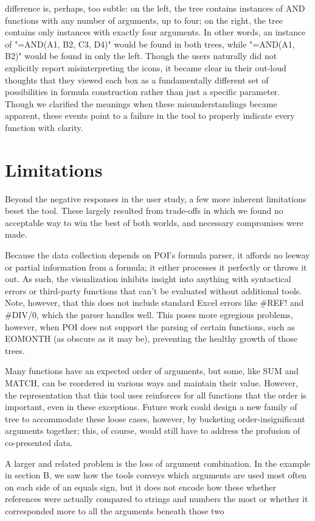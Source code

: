 \documentclass[conference]{IEEEtran}
\begin{document}
	difference is, perhaps, too subtle: on the left, the tree contains instances of
	AND functions with any number of arguments, up to four; on the right, the tree
	contains only instances with exactly four arguments. In other words, an
	instance of "=AND(A1, B2, C3, D4)" would be found in both trees, while
	"=AND(A1, B2)" would be found in only the left. Though the users naturally did
	not explicitly report misinterpreting the icons, it became clear in their
	out-loud thoughts that they viewed each box as a fundamentally different set of
	possibilities in formula construction rather than just a specific parameter.
	Though we clarified the meanings when these misunderstandings became apparent,
	these events point to a failure in the tool to properly indicate every function
	with clarity.   \par
	
	
	
	\section{Limitations} Beyond the negative responses in the user study, a few
	more inherent limitations beset the tool. These largely resulted from
	trade-offs in which we found no acceptable way to win the best of both worlds,
	and necessary compromises were made. \par Because the data collection depends
	on POI's formula parser, it affords no leeway or partial information from a
	formula; it either processes it perfectly or throws it out. As such, the
	visualization inhibits insight into anything with syntactical errors or
	third-party functions that can't be evaluated without additional tools. Note,
	however, that this does not include standard Excel errors like \#REF! and
	\#DIV/0, which the parser handles well. This poses more egregious problems,
	however, when POI does not support the parsing of certain functions, such as
	EOMONTH (as obscure as it may be), preventing the healthy growth of those
	trees. \par Many functions have an expected order of arguments, but some, like
	SUM and MATCH, can be reordered in various ways and maintain their value.
	However, the representation that this tool uses reinforces for all functions
	that the order is important, even in these exceptions. Future work could design
	a new family of tree to accommodate these loose cases, however, by bucketing
	order-insignificant arguments together; this, of course, would still have to
	address the profusion of co-presented data. \par A larger and related problem
	is the loss of argument combination. In the example in section B, we saw how
	the tools conveys which arguments are used most often on each side of an equals
	sign, but it does not encode how these whether references were actually
	compared to strings and numbers the most or whether it corresponded more to all
	the arguments beneath those two
	
\end{document}
